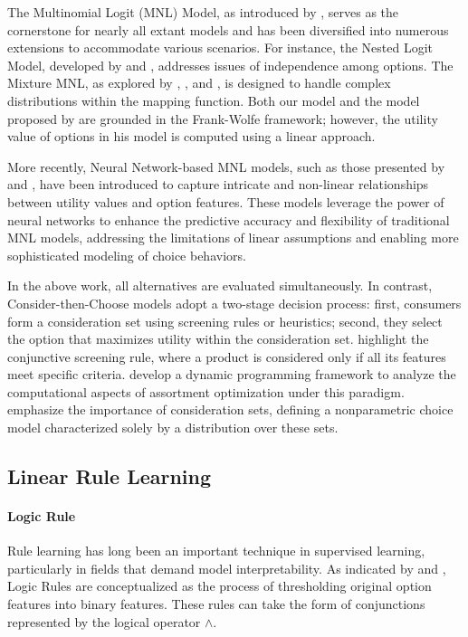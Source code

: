 \documentclass{article} %
\begin{document}
The Multinomial Logit (MNL) Model, as introduced by \citet{hausman1984specification}, serves as the cornerstone for nearly all extant models and has been diversified into numerous extensions to accommodate various scenarios. For instance, the Nested Logit Model, developed by \citet{wen2001generalized} and \citet{hensher2002specification}, addresses issues of independence among options. The Mixture MNL, as explored by \citet{jagabathula2020conditional}, \citet{bhat1997endogenous}, and \citet{greene2003latent}, is designed to handle complex distributions within the mapping function. Both our model and the model proposed by \citet{jagabathula2020conditional} are grounded in the Frank-Wolfe framework; however, the utility value of options in his model is computed using a linear approach.

More recently, Neural Network-based MNL models, such as those presented by \citet{aouad2022representing} and \citet{wang2020deep}, have been introduced to capture intricate and non-linear relationships between utility values and option features. These models leverage the power of neural networks to enhance the predictive accuracy and flexibility of traditional MNL models, addressing the limitations of linear assumptions and enabling more sophisticated modeling of choice behaviors.

In the above work, all alternatives are evaluated simultaneously. In contrast, Consider-then-Choose models adopt a two-stage decision process: first, consumers form a consideration set using screening rules or heuristics; second, they select the option that maximizes utility within the consideration set. \citet{liu2011efficient} highlight the conjunctive screening rule, where a product is considered only if all its features meet specific criteria. \citet{aouad2021assortment} develop a dynamic programming framework to analyze the computational aspects of assortment optimization under this paradigm. \citet{akchen2023consider} emphasize the importance of consideration sets, defining a nonparametric choice model characterized solely by a distribution over these sets.

\subsection{Linear Rule Learning}
\paragraph{Logic Rule} Rule learning has long been an important technique in supervised learning, particularly in fields that demand model interpretability. As indicated by \citet{rivest1987learning} and \citet{wei2019generalized}, Logic Rules are conceptualized as the process of thresholding original option features into binary features. These rules can take the form of conjunctions represented by the logical operator $\wedge$. 
\end{document}
